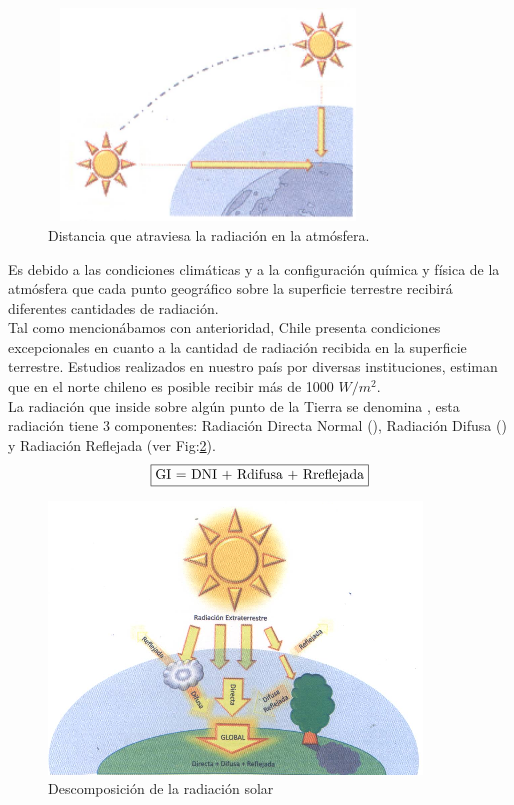 \begin{figure}[h!]
        \centering
        \includegraphics[width=240pt,height=160pt]{images/espesorAtmosfera}
        \caption{Distancia que atraviesa la radiación en la atmósfera.}
	\label{fig:atmosfera}
\end{figure}
\newpage

Es debido a las condiciones climáticas y a la configuración química y física de la atmósfera que cada punto geográfico sobre la superficie terrestre recibirá diferentes cantidades de radiación.\\

Tal como mencionábamos con anterioridad, Chile presenta condiciones excepcionales en cuanto a la cantidad de radiación recibida en la superficie terrestre. Estudios realizados en nuestro país por diversas instituciones\cite{recursoSolar:2}, estiman que en el norte chileno es posible recibir más de 1000 $W/{m}^{2}$.\\

La radiación que inside sobre algún punto de la Tierra se denomina , esta radiación tiene 3 componentes: Radiación Directa Normal (), Radiación Difusa () y Radiación Reflejada (ver Fig:\ref{fig:componentes}).
$$\fbox{GI = DNI + Rdifusa + Rreflejada}$$

\begin{figure}[h!]
        \centering
        \includegraphics[scale=0.6]{images/radiacionDescompocicion}
        \caption{Descomposición de la radiación solar\cite{recursoSolar:1}}
	\label{fig:componentes}
\end{figure}


